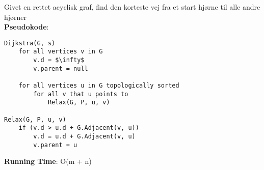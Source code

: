 Givet en rettet acyclisk graf, find den korteste vej fra et start hjørne til alle andre hjørner\\
\textbf{Pseudokode}:
\begin{lstlisting}[frame=single, mathescape=true]
Dijkstra(G, s)
	for all vertices v in G
		v.d = $\infty$
		v.parent = null
	
	for all vertices u in G topologically sorted
		for all v that u points to
			Relax(G, P, u, v)

Relax(G, P, u, v)
	if (v.d > u.d + G.Adjacent(v, u))
		v.d = u.d + G.Adjacent(v, u)
		v.parent = u
\end{lstlisting}
\textbf{Running Time}: O(m + n)